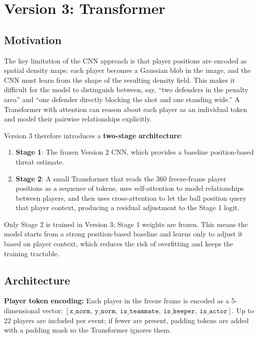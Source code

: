 \documentclass{article}
\begin{document}
\section{Version 3: Transformer}\label{sec:v3}

\subsection{Motivation}

The key limitation of the CNN approach is that player positions are encoded as spatial density maps: each player becomes a Gaussian blob in the image, and the CNN must learn from the shape of the resulting density field. This makes it difficult for the model to distinguish between, say, ``two defenders in the penalty area'' and ``one defender directly blocking the shot and one standing wide.'' A Transformer with attention can reason about each player as an individual token and model their pairwise relationships explicitly.

Version 3 therefore introduces a \textbf{two-stage architecture}:
\begin{enumerate}
    \item \textbf{Stage 1}: The frozen Version 2 CNN, which provides a baseline position-based threat estimate.
    \item \textbf{Stage 2}: A small Transformer that reads the 360 freeze-frame player positions as a sequence of tokens, uses self-attention to model relationships between players, and then uses cross-attention to let the ball position query that player context, producing a residual adjustment to the Stage 1 logit.
\end{enumerate}

Only Stage 2 is trained in Version 3; Stage 1 weights are frozen. This means the model starts from a strong position-based baseline and learns only to adjust it based on player context, which reduces the risk of overfitting and keeps the training tractable.

\subsection{Architecture}

\textbf{Player token encoding:} Each player in the freeze frame is encoded as a 5-dimensional vector: $[\texttt{x\_norm},\ \texttt{y\_norm},\ \texttt{is\_teammate},\ \texttt{is\_keeper},\ \texttt{is\_actor}]$. Up to 22 players are included per event; if fewer are present, padding tokens are added with a padding mask so the Transformer ignores them.
\end{document}
